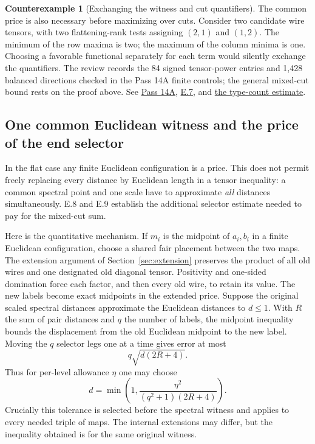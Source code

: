 \documentclass[11pt,letterpaper]{article}
\theoremstyle{definition}\newtheorem{definition}[theorem]{Definition}\newtheorem{example}[theorem]{Example}
\newtheorem{counterexample}[theorem]{Counterexample}
\theoremstyle{remark}\newtheorem{remark}[theorem]{Remark}
\newcommand{\pub}[3]{\href{https://github.com/anthropics/formal-math/blob/11b6c7e3c927df2658f513b6b68ea7f8929c62c5/vp-vnp/#1\#L#2}{#3}}
\newcommand{\aud}[2]{\href{https://github.com/nousentllc/VP-VNP-Review/blob/567303d0bcf4f9d54390437b137752446e58ccd6/#1}{#2}}
\begin{document}
\begin{counterexample}[Exchanging the witness and cut quantifiers]\label{ex:mixed}
The common price is also necessary before maximizing over cuts. Consider two candidate wire tensors, with two flattening-rank tests assigning $(2,1)$ and $(1,2)$. The minimum of the row maxima is two; the maximum of the column minima is one. Choosing a favorable functional separately for each term would silently exchange the quantifiers. The review records the 84 signed tensor-power entries and 1,428 balanced directions checked in the Pass 14A finite controls; the general mixed-cut bound rests on the proof above. See \aud{passes/14a-flat.md}{Pass 14A}, \pub{Paper/Convex.lean}{22}{E.7}, and \pub{Nc/Price/BorderFew.lean}{134}{the type-count estimate}.
\end{counterexample}


\subsection{One common Euclidean witness and the price of the end selector}\label{sec:euclid}
In the flat case any finite Euclidean configuration is a price. This does not permit freely replacing every distance by Euclidean length in a tensor inequality: a common spectral point and one scale have to approximate \emph{all} distances simultaneously. E.8 and E.9 establish the additional selector estimate needed to pay for the mixed-cut sum.

Here is the quantitative mechanism. If $m_i$ is the midpoint of $a_i,b_i$ in a finite Euclidean configuration, choose a shared fair placement between the two maps. The extension argument of Section~\ref{sec:extension} preserves the product of all old wires and one designated old diagonal tensor. Positivity and one-sided domination force each factor, and then every old wire, to retain its value. The new labels become exact midpoints in the extended price. Suppose the original scaled spectral distances approximate the Euclidean distances to $d\le1$. With $R$ the sum of pair distances and $q$ the number of labels, the midpoint inequality bounds the displacement from the old Euclidean midpoint to the new label. Moving the $q$ selector legs one at a time gives error at most
\[
 q\sqrt{d(2R+4)}.
\]
Thus for per-level allowance $\eta$ one may choose
\[
 d=\min\left(1,\frac{\eta^2}{(q^2+1)(2R+4)}\right).
\]
Crucially this tolerance is selected before the spectral witness and applies to every needed triple of maps. The internal extensions may differ, but the inequality obtained is for the same original witness.
\end{document}
